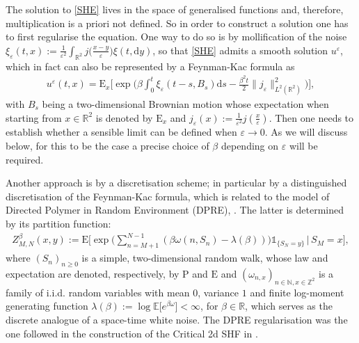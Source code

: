 \documentclass[a4paper,reqno,11pt]{amsart}
\numberwithin{equation}{section}
\theoremstyle{mytheorem}
\newcommand{\bbE}{{\ensuremath{\mathbb E}} }
\newcommand{\gb}{\beta}
\newcommand{\go}{\omega}
\newcommand{\R}{\mathbb{R}}
\newcommand{\Z}{\mathbb{Z}}
\newcommand{\N}{\mathbb{N}}
\def\bs{\boldsymbol}
\newcommand{\PEfont}{\mathrm}
\newcommand{\p}{\ensuremath{\PEfont P}}
\newcommand{\E}{\ensuremath{\PEfont  E}}
\renewcommand{\P}{\p}
\newcommand\bE{\ensuremath{\bs{\mathrm{E}}}}
\newcommand{\ind}{\mathds{1}}
\renewcommand{\epsilon}{\varepsilon}
\newcommand\dd{\mathrm{d}}
\begin{document}
The solution to \eqref{SHE} lives in the space of generalised functions and, therefore, 
multiplication is a priori not defined. So in order to construct a solution one has to first regularise the equation. One way to do so is
by mollification of the noise $\xi_\epsilon(t,x):=\frac{1}{\epsilon^2}\int_{\R^2} j\big( \frac{x-y}{\epsilon}\big) \xi(t, \dd y)$, so that \eqref{SHE} admits a smooth solution $u^\epsilon$, which in fact can also be represented by a Feynman-Kac formula as
\begin{align}\label{eq:FK}
u^\epsilon(t,x)=\bE_x\Big[ \exp\Big( \beta \int_0^t \xi_\epsilon(t-s, B_s) \dd s - 
\frac{\beta^2 t}{2}\|j_\epsilon\|_{L^2(\R^2)}^2 \Big) \Big],
\end{align}
with $B_s$ being a two-dimensional Brownian motion whose expectation when starting from $x\in \R^2$ is denoted by $\bE_x$ and $j_\epsilon(x):=\frac{1}{\epsilon^2}j(\frac{x}{\epsilon})$. Then one needs to establish whether a sensible limit can be defined when $\epsilon\to 0$. As we will discuss below, for this to be the case a precise choice of $\beta$ depending on $\epsilon$ will be required.

Another approach is by a discretisation scheme; in particular by a distinguished discretisation of the 
Feynman-Kac formula, which is related to the model of
Directed Polymer in Random Environment (DPRE), \cite{C17, Z24}. 
The latter is determined by its partition function:
\begin{align}\label{Z(x,y)}
    Z_{M,N}^{\beta}(x,y) :=\E\Big[  \exp\big(\sum^{N-1}_{n=M+1}(\gb\go(n,S_n)-\lambda(\gb))\Big) \ind_{\{S_{N}=y\}} \, |\, S_M=x\Big],
\end{align}
where $(S_n)_{n\geq 0}$ is a simple, two-dimensional random walk, whose law and expectation 
are denoted, respectively, by $\P$ and $ \E$ and $(\omega_{n,x})_{n\in \N, x\in \Z^2}$ is a family of i.i.d. random variables 
with mean $0$, variance $1$ and finite log-moment generating function $\lambda(\beta):=\log\bbE\big[ e^{\beta\omega} \big]<\infty$, for $\beta\in \R$, which serves as the discrete analogue of a space-time white noise. 
 The DPRE regularisation was the one followed in the construction of the Critical 2d SHF in \cite{CSZ23a}.   
 
\end{document}
